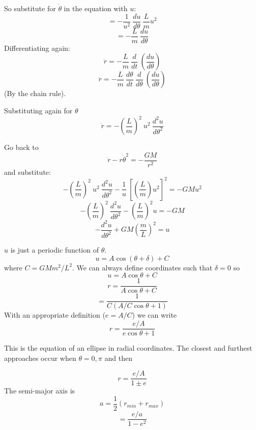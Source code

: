 \documentclass[11pt, oneside]{article}
\begin{document}
So substitute for $\dot{\theta}$ in the equation with $u$:
\[ = -\frac{1}{u^2} \ \frac{du}{d \theta} \ \frac{L}{m} u^2 \]
\[= -\frac{L}{m} \ \frac{du}{d \theta}  \]
Differentiating again:
\[ \ddot{r} = -\frac{L}{m} \ \frac{d}{dt} \ ( \frac{du}{d \theta} ) \]
\[ \ddot{r} = -\frac{L}{m} \ \frac{d \theta}{dt} \ \frac{d}{d \theta} \ ( \frac{du}{d \theta} ) \]
(By the chain rule).

Substituting again for $\dot{\theta}$
\[ \ddot{r} = - (\frac{L}{m})^2 \ u^2 \ \frac{d^2u}{d \theta^2} \]

Go back to 
\[  \ddot{r}  - r \dot{\theta}^2 = - \frac{GM}{r^2} \]
and substitute:
\[ - (\frac{L}{m})^2 \ u^2 \ \frac{d^2u}{d \theta^2} - \frac{1}{u} \ [ (\frac{L}{m})u^2]^2  = - GMu^2\]
\[ - (\frac{L}{m})^2 \ \frac{d^2u}{d \theta^2} - (\frac{L}{m})^2u  = - GM\]
\[ - \frac{d^2u}{d \theta^2} + GM (\frac{m}{L})^2   = u \]

$u$ is just a periodic function of $\theta$.
\[ u = A \cos ( \theta + \delta) + C \]
where $C = GMm^2/L^2$. 
We can always define coordinates such that $\delta = 0$ so
\[ u = A \cos \theta + C \]
\[ r = \frac{1}{A \cos \theta + C} \]
\[ = \frac{1}{C (A/C \cos \theta + 1)} \]
With an appropriate definition ($e = A/C$) we can write
\[ r = \frac{e/A}{ e \cos \theta + 1} \]

This is the equation of an ellipse in radial coordinates.  The closest and furthest approaches occur when $\theta = 0, \pi$ and then 

\[ r = \frac{e/A}{ 1 \pm e} \]
The semi-major axis is 
\[ a = \frac{1}{2}(r_{min} + r_{max}) \]
\[ = \frac{e/a}{1 - e^2} \]
\end{document}
